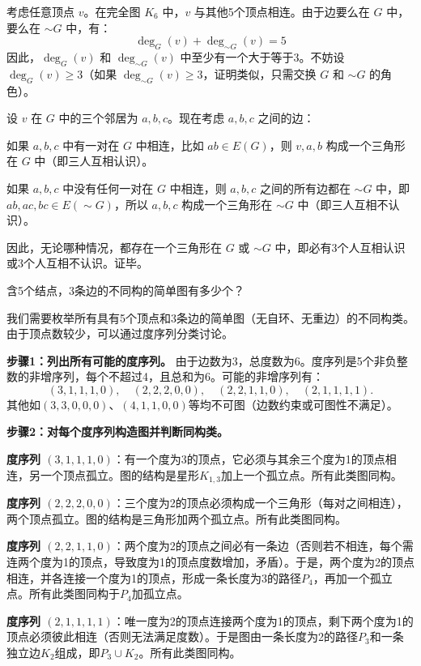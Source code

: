\documentclass[lang=cn,11pt]{elegantbook}
\begin{document}
考虑任意顶点 $v$。在完全图 $K_6$ 中，$v$ 与其他5个顶点相连。由于边要么在 $G$ 中，要么在 $\sim G$ 中，有：
\[\deg_G(v) + \deg_{\sim G}(v) = 5\]
因此，$\deg_G(v)$ 和 $\deg_{\sim G}(v)$ 中至少有一个大于等于3。不妨设 $\deg_G(v) \geqslant 3$（如果 $\deg_{\sim G}(v) \geqslant 3$，证明类似，只需交换 $G$ 和 $\sim G$ 的角色）。

设 $v$ 在 $G$ 中的三个邻居为 $a, b, c$。现在考虑 $a, b, c$ 之间的边：

如果 $a, b, c$ 中有一对在 $G$ 中相连，比如 $ab \in E(G)$，则 $v, a, b$ 构成一个三角形在 $G$ 中（即三人互相认识）。

如果 $a, b, c$ 中没有任何一对在 $G$ 中相连，则 $a, b, c$ 之间的所有边都在 $\sim G$ 中，即 $ab, ac, bc \in E(\sim G)$，所以 $a, b, c$ 构成一个三角形在 $\sim G$ 中（即三人互相不认识）。

因此，无论哪种情况，都存在一个三角形在 $G$ 或 $\sim G$ 中，即必有3个人互相认识或3个人互相不认识。证毕。
\begin{example}
    含5个结点，3条边的不同构的简单图有多少个？
\end{example}
我们需要枚举所有具有5个顶点和3条边的简单图（无自环、无重边）的不同构类。由于顶点数较少，可以通过度序列分类讨论。

\noindent \textbf{步骤1：列出所有可能的度序列。}
由于边数为3，总度数为6。度序列是5个非负整数的非增序列，每个不超过4，且总和为6。可能的非增序列有：
\[
(3,1,1,1,0),\quad (2,2,2,0,0),\quad (2,2,1,1,0),\quad (2,1,1,1,1).
\]
其他如$(3,3,0,0,0)$、$(4,1,1,0,0)$等均不可图（边数约束或可图性不满足）。

\textbf{步骤2：对每个度序列构造图并判断同构类。}

\textbf{度序列 $(3,1,1,1,0)$}：有一个度为3的顶点，它必须与其余三个度为1的顶点相连，另一个顶点孤立。图的结构是星形$K_{1,3}$加上一个孤立点。所有此类图同构。

\textbf{度序列 $(2,2,2,0,0)$}：三个度为2的顶点必须构成一个三角形（每对之间相连），两个顶点孤立。图的结构是三角形加两个孤立点。所有此类图同构。

\textbf{度序列 $(2,2,1,1,0)$}：两个度为2的顶点之间必有一条边（否则若不相连，每个需连两个度为1的顶点，导致度为1的顶点度数增加，矛盾）。于是，两个度为2的顶点相连，并各连接一个度为1的顶点，形成一条长度为3的路径$P_4$，再加一个孤立点。所有此类图同构于$P_4$加孤立点。

\textbf{度序列 $(2,1,1,1,1)$}：唯一度为2的顶点连接两个度为1的顶点，剩下两个度为1的顶点必须彼此相连（否则无法满足度数）。于是图由一条长度为2的路径$P_3$和一条独立边$K_2$组成，即$P_3 \cup K_2$。所有此类图同构。
\end{document}
